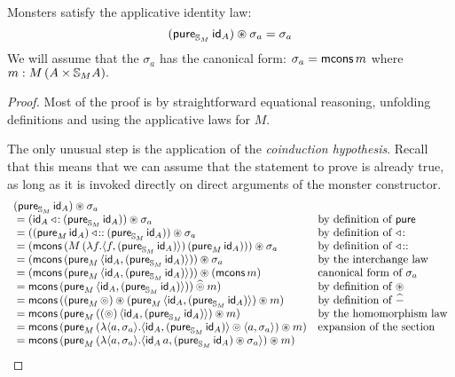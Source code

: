 \begin{lemma}
Monsters satisfy the applicative identity law:
$$
(\mathsf{pure}_{\mathbb{S}_{M}}\,\mathsf{id}_A) \circledast \sigma_a = \sigma_a
$$
We will assume that the $\sigma_a$ has the canonical form:
$\sigma_a = \mathsf{mcons}\,m$ where $m:M\,(A\times \mathbb{S}_{M}A).$
\end{lemma}
\begin{proof}
Most of the proof is by straightforward equational reasoning, unfolding definitions and using the applicative laws for $M$.

The only unusual step is the application of the {\em coinduction hypothesis}.
Recall that this means that we can assume that the statement to prove is already true, as long as it is invoked directly on direct arguments of the monster constructor.
$$
\begin{array}{ll}
(\apure_{\stream{M}}\,\id_A) \appl \sigma_a \\
{}= (\id_A \acons (\apure_{\stream{M}}\,\id_A)) \appl \sigma_a
  & \mbox{by definition of }\apure \\
{}= ((\apure_M\,\id_A) \fcons (\apure_{\stream{M}}\,\id_A)) \appl \sigma_a
  & \mbox{by definition of }\acons \\
{}= (\mcons\,(M\,(\lambda f. \langle f, (\apure_{\stream{M}}\,\id_A)\rangle)\,(\apure_M\,\id_A))) \appl \sigma_a
  & \mbox{by definition of }\fcons \\
{}= (\mcons\,(\apure_M\,\langle \id_A, (\apure_{\stream{M}}\,\id_A)\rangle)) \appl \sigma_a
  & \mbox{by the interchange law} \\
{}= (\mcons\,(\apure_M\,\langle \id_A, (\apure_{\stream{M}}\,\id_A)\rangle)) \appl (\mcons\,m)
  & \mbox{canonical form of }\sigma_a\\
{}= \mcons\,(\apure_M\,\langle \id_A, (\apure_{\stream{M}}\,\id_A)\rangle)) \alift{\pappl}  m)
  & \mbox{by definition of }\appl \\
{}= \mcons\,((\apure_{M}\,\pappl) \appl (\apure_M\,\langle \id_A, (\apure_{\stream{M}}\,\id_A)\rangle) \appl  m)
  & \mbox{by definition of }\alift{-} \\
{}= \mcons\,(\apure_M\,((\pappl)\,\langle \id_A, (\apure_{\stream{M}}\,\id_A)\rangle) \appl  m)
  & \mbox{by the homomorphism law}\\
{}= \mcons\,(\apure_M\,(\lambda \langle a,\sigma_a\rangle. \langle \id_A, (\apure_{\stream{M}}\,\id_A)\rangle \pappl \langle a,\sigma_a\rangle) \appl m)
  & \mbox{expansion of the section}\\
{}= \mcons\,(\apure_M\,(\lambda \langle a,\sigma_a\rangle. \langle \id_A\,a, (\apure_{\stream{M}}\,\id_A) \appl \sigma_a\rangle) \appl m)

\end{array}$$
\end{proof}
